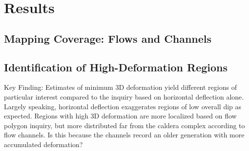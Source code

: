 \chapter{Results}
\section{Mapping Coverage: Flows and Channels}
\section{Identification of High-Deformation Regions}
Key Finding: Estimates of minimum 3D deformation yield different regions of particular interest compared to the inquiry based on horizontal deflection alone. Largely speaking, horizontal deflection exaggerates regions of low overall dip as expected. Regions with high 3D deformation are more localized based on flow polygon inquiry, but more distributed far from the caldera complex according to flow channels. Is this because the channels record an older generation with more accumulated deformation? 